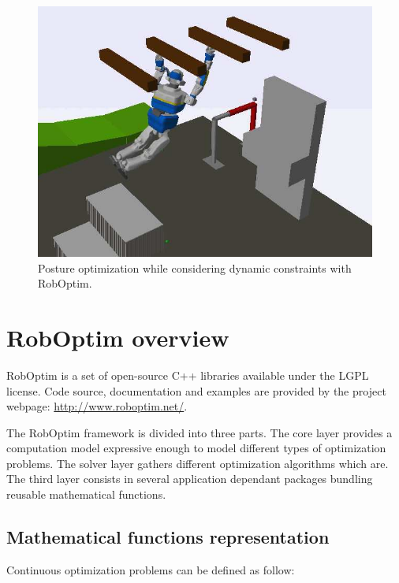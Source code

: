 \documentclass[conference,final,a4paper,twocolumn,9pt]{IEEEtran}
\begin{document}
\begin{figure}[ht!]
  \begin{center}
    \includegraphics[width=\linewidth]{agent-067.jpg}
    \caption{Posture optimization while considering dynamic
      constraints with RobOptim.\label{fig:stence-optimization}}
  \end{center}
\end{figure}



\section{RobOptim overview}\label{sec:roboptim}


RobOptim is a set of open-source C++ libraries available under the
LGPL license. Code source, documentation and examples are provided by
the project webpage: \mbox{\url{http://www.roboptim.net/}}.


The RobOptim framework is divided into three parts. The core layer
provides a computation model expressive enough to model different
types of optimization problems. The solver layer gathers different
optimization algorithms which are. The third layer consists in several
application dependant packages bundling reusable mathematical
functions.


\subsection{Mathematical functions representation}


Continuous optimization problems can be defined as follow:
\end{document}
